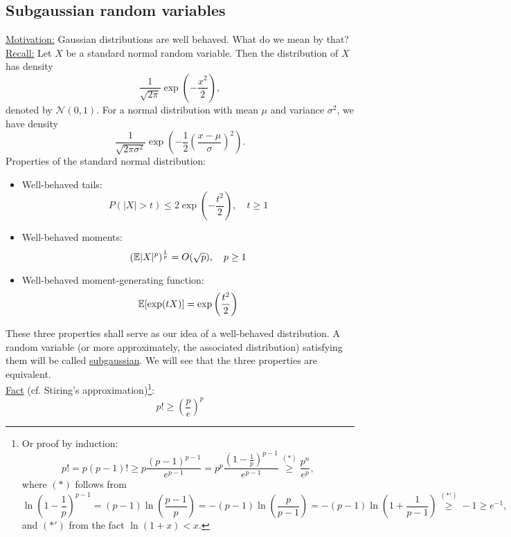 \subsection{Subgaussian random variables}
\underline{Motivation:} Gaussian distributions are well behaved. What do we mean by that? \\
\underline{Recall:} Let $X$ be a  standard normal random variable. Then the distribution of $X$ has density
\begin{equation*}
\frac{1}{\sqrt{2\pi}}\exp\left(-\frac{x^2}{2}\right),
\end{equation*}
denoted by $\mathcal{N}(0,1)$. For a normal distribution with mean $\mu$ and variance $\sigma^2$, we have density
$$
\frac{1}{\sqrt{2\pi\sigma^2}}\exp\left(-\frac{1}{2}\left(\frac{x-\mu}{\sigma}\right)^2\right).
$$
Properties of the standard normal distribution:
\begin{itemize}[itemsep=0pc]
\item Well-behaved tails:
$$P(|X|>t) \leq 2\exp\left(
-\frac{t^2}{2}
\right),\quad t\geq 1$$
\item Well-behaved moments:
$$
(\mathbb{E} |X|^p)^{\frac{1}{p}} = O (\sqrt{p}),\quad p\geq 1
$$
\item Well-behaved moment-generating function:
$$
\mathbb{E}[\exp(tX)]=\exp\left(\frac{t^2}{2}\right)
$$
\end{itemize}
These three properties shall serve as our idea of a well-behaved distribution. A random variable (or more approximately, the associated distribution) satisfying them will be called \underline{subgaussian}. We will see that the three properties are equivalent. \\
\underline{Fact} (cf. Stiring's approximation)\footnote{
Or proof by induction:
$$p! = p(p-1)! \geq p \frac{(p-1)^{p-1}}{e^{p-1}} = p^p \frac{\left(1-\frac{1}{p}\right)^{p-1}}{e^{p-1}} \overset{(*)}\geq \frac{p^n}{e^p},$$
where $(*)$ follows from
\begin{equation*}
\ln \left(1-\frac{1}{p}\right)^{p-1} = (p-1)\ln \left(
\frac{p-1}{p}
\right) = - (p-1) \ln\left(\frac{p}{p-1}\right) = - (p-1) \ln\left(1+\frac{1}{p-1}\right) \overset{(*')}\geq -1 \geq e^{-1},
\end{equation*}
and $(*')$ from the fact $\ln(1+x)<x$.
}:
$$
p! \geq \left(
\frac{p}{e}
 \right)^p
$$
\vspace{-1pc}
